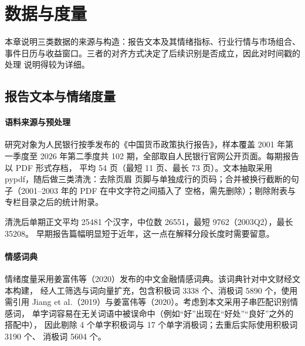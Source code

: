 
\section{数据与度量}

本章说明三类数据的来源与构造：报告文本及其情绪指标、行业行情与市场组合、
事件日历与收益窗口。三者的对齐方式决定了后续识别是否成立，因此对时间戳的处理
说明得较为详细。

\subsection{报告文本与情绪度量}

\paragraph{语料来源与预处理}
研究对象为人民银行按季发布的《中国货币政策执行报告》，样本覆盖 2001 年第一季度至
2026 年第二季度共 102 期，全部取自人民银行官网公开页面。每期报告以 PDF 形式存档，
平均 54 页（最短 11 页、最长 73 页）。文本抽取采用 pypdf，随后做三类清洗：去除页眉
页脚与单独成行的页码；合并被换行截断的句子（2001--2003 年的 PDF 在中文字符之间插入了
空格，需先删除）；剔除附表与专栏目录之后的统计附录。

清洗后单期正文平均 25481 个汉字，中位数 26551，最短 9762（2003Q2），最长 35208。
早期报告篇幅明显短于近年，这一点在解释分段长度时需要留意。

\paragraph{情感词典}
情绪度量采用姜富伟等（2020）发布的中文金融情感词典。该词典针对中文财经文本构建，
经人工筛选与词向量扩充，包含积极词 3338 个、消极词 5890 个，使用需引用
Jiang et al.（2019）与姜富伟等（2020）。考虑到本文采用子串匹配识别情感词，
单字词容易在无关词语中被误命中（例如“好”出现在“好处”“良好”之外的搭配中），
因此剔除 4 个单字积极词与 17 个单字消极词；去重后实际使用积极词 3190 个、
消极词 5604 个。

